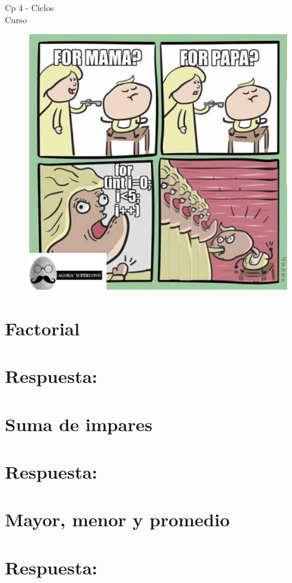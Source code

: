 \begin{center}
    \begin{large}
    Cp 4 - Ciclos\\
    Curso \academicyear\\
    \end{large}
    \begin{figure}[h]
    	\centering
    	\includegraphics[width=0.5\linewidth]{cp4/loops2.png}
    \end{figure}
\end{center}

\section{Factorial}

\ifshowanswers
\section*{Respuesta:}

\fi

\section{Suma de impares}

\ifshowanswers
\section*{Respuesta:}

\fi

\section{Mayor, menor y promedio}

\ifshowanswers
\section*{Respuesta:}

\fi

